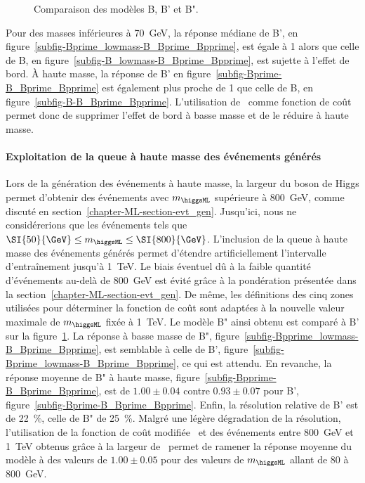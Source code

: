 \begin{figure}[p]
\caption{Comparaison des modèles B, B' et B".}
\label{fig-B_Bprime_Bpprime-boundaries_effect}
\end{figure}
Pour des masses inférieures à \SI{70}{\GeV},
la réponse médiane de B', en figure~\ref{subfig-Bprime_lowmass-B_Bprime_Bpprime},
est égale à 1 alors que celle de B, en figure~\ref{subfig-B_lowmass-B_Bprime_Bpprime},
est sujette à l'effet de bord.
À haute masse,
la réponse de B' en figure~\ref{subfig-Bprime-B_Bprime_Bpprime} est également plus proche de 1
que celle de B, en figure~\ref{subfig-B-B_Bprime_Bpprime}.
L'utilisation de  \LossMAPEsqrt\ comme fonction de coût permet donc de
supprimer l'effet de bord à basse masse
et de le réduire à haute masse.
\paragraph{Exploitation de la queue à haute masse des événements générés}
Lors de la génération des événements à haute masse, la largeur du boson de Higgs permet d'obtenir des événements avec $m_{\higgsML}$ supérieure à \SI{800}{\GeV}, comme discuté en section~\ref{chapter-ML-section-evt_gen}.
Jusqu'ici, nous ne considérerions que les événements tels que
$\SI{50}{\GeV}\leq m_{\higgsML}\leq \SI{800}{\GeV}$.
L'inclusion de la queue à haute masse des événements générés permet d'étendre artificiellement l'intervalle d'entraînement jusqu'à \SI{1}{\TeV}.
Le biais éventuel dû à la faible quantité d'événements au-delà de \SI{800}{\GeV} est évité grâce à la pondération présentée dans la section~\ref{chapter-ML-section-evt_gen}.
De même, les définitions des cinq zones utilisées pour déterminer la fonction de coût sont adaptées à la nouvelle valeur maximale de $m_{\higgsML}$ fixée à \SI{1}{\TeV}.
Le modèle B" ainsi obtenu est comparé à B'
sur la figure~\ref{fig-B_Bprime_Bpprime-boundaries_effect}.
La réponse à basse masse de B", figure~\ref{subfig-Bpprime_lowmass-B_Bprime_Bpprime},
est semblable à celle de B', figure~\ref{subfig-Bprime_lowmass-B_Bprime_Bpprime},
ce qui est attendu.
En revanche, la réponse moyenne de B" à haute masse, figure~\ref{subfig-Bpprime-B_Bprime_Bpprime},
est de $\num{1.00}\pm\num{0.04}$
contre $\num{0.93}\pm\num{0.07}$ pour B', figure~\ref{subfig-Bprime-B_Bprime_Bpprime}.
Enfin, la résolution relative de B' est de \SI{22}{\%}, celle de B" de \SI{25}{\%}.
Malgré une légère dégradation de la résolution,
l'utilisation de la fonction de coût modifiée \LossMAPEsqrtb\
et des événements entre \SI{800}{\GeV} et \SI{1}{\TeV} obtenus grâce à la largeur de \higgsML\
permet de ramener la réponse moyenne du modèle à des valeurs de $\num{1.00}\pm\num{0.05}$
pour des valeurs de $m_{\higgsML}$ allant de \num{80} à \SI{800}{\GeV}.
